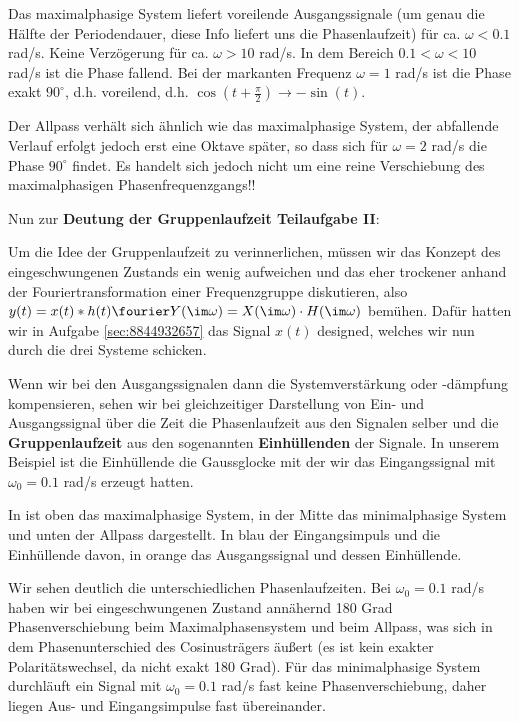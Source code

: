 \begin{Loesung}
Das maximalphasige System liefert voreilende Ausgangssignale (um genau die Hälfte
der Periodendauer, diese Info liefert uns die Phasenlaufzeit) für ca.
$\omega<0.1$ rad/s. Keine Verzögerung für ca. $\omega>10$ rad/s.
In dem Bereich $0.1 < \omega < 10$ rad/s ist die Phase fallend.
Bei der markanten Frequenz $\omega=1$ rad/s ist die Phase exakt $90^\circ$, d.h.
voreilend, d.h. $\cos(t+\frac{\pi}{2})\to -\sin(t)$.

Der Allpass verhält sich ähnlich wie das maximalphasige System, der abfallende
Verlauf erfolgt jedoch erst eine Oktave später, so dass sich für
$\omega=2$ rad/s die Phase $90^\circ$ findet. Es handelt sich jedoch nicht um eine
reine Verschiebung des maximalphasigen Phasenfrequenzgangs!!

Nun zur \textbf{Deutung der Gruppenlaufzeit Teilaufgabe II}:

Um die Idee der Gruppenlaufzeit zu verinnerlichen, müssen wir das Konzept des
eingeschwungenen Zustands ein wenig aufweichen und das eher trockener
anhand der Fouriertransformation einer Frequenzgruppe diskutieren, also
$y(t) = x(t)\ast h(t)\fourier Y(\im\omega)=X(\im\omega)\cdot H(\im\omega)$
bemühen. Dafür hatten wir in Aufgabe \ref{sec:8844932657} das Signal $x(t)$
designed, welches wir nun durch die drei Systeme schicken.

Wenn wir bei den Ausgangssignalen dann die Systemverstärkung oder -dämpfung
kompensieren, sehen wir bei gleichzeitiger Darstellung von Ein- und Ausgangssignal
über die Zeit die Phasenlaufzeit aus den Signalen selber und die \textbf{Gruppenlaufzeit}
aus den sogenannten \textbf{Einhüllenden} der Signale.
In unserem Beispiel ist die Einhüllende die
Gaussglocke mit der wir das Eingangssignal mit $\omega_0=0.1$ rad/s erzeugt hatten.

In  ist oben das maximalphasige System, in
der Mitte das minimalphasige System und unten der Allpass dargestellt. In blau
der Eingangsimpuls und die Einhüllende davon, in orange das Ausgangssignal
und dessen Einhüllende.

Wir sehen deutlich die unterschiedlichen Phasenlaufzeiten. Bei $\omega_0=0.1$ rad/s
haben wir bei eingeschwungenen Zustand annähernd 180 Grad Phasenverschiebung
beim Maximalphasensystem und beim Allpass, was sich in dem Phasenunterschied
des Cosinusträgers äußert (es ist kein exakter Polaritätswechsel, da nicht exakt
180 Grad). Für das minimalphasige System durchläuft ein Signal mit
$\omega_0=0.1$ rad/s fast keine Phasenverschiebung, daher liegen Aus- und Eingangsimpulse
fast übereinander.


\end{Loesung}
